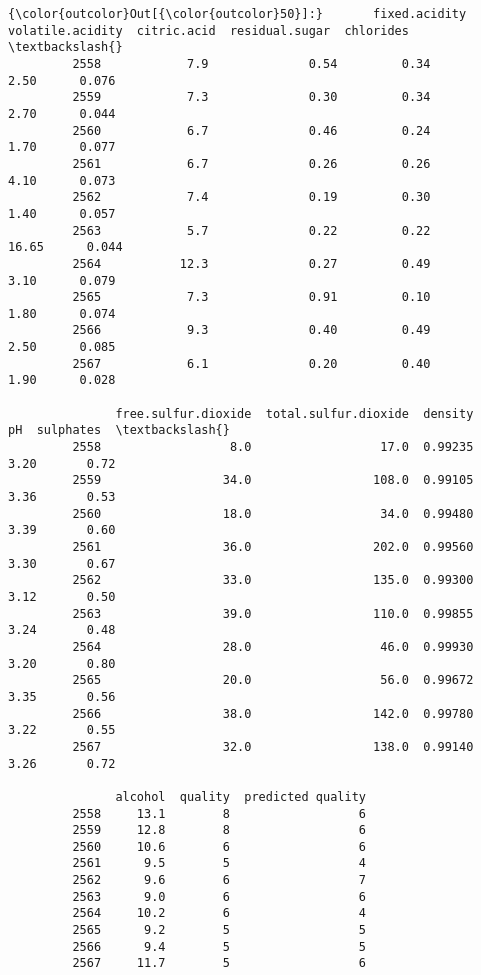 \documentclass[11pt]{article}
\begin{document}
\begin{Verbatim}[commandchars=\\\{\}]
{\color{outcolor}Out[{\color{outcolor}50}]:}       fixed.acidity  volatile.acidity  citric.acid  residual.sugar  chlorides  \textbackslash{}
         2558            7.9              0.54         0.34            2.50      0.076   
         2559            7.3              0.30         0.34            2.70      0.044   
         2560            6.7              0.46         0.24            1.70      0.077   
         2561            6.7              0.26         0.26            4.10      0.073   
         2562            7.4              0.19         0.30            1.40      0.057   
         2563            5.7              0.22         0.22           16.65      0.044   
         2564           12.3              0.27         0.49            3.10      0.079   
         2565            7.3              0.91         0.10            1.80      0.074   
         2566            9.3              0.40         0.49            2.50      0.085   
         2567            6.1              0.20         0.40            1.90      0.028   
         
               free.sulfur.dioxide  total.sulfur.dioxide  density    pH  sulphates  \textbackslash{}
         2558                  8.0                  17.0  0.99235  3.20       0.72   
         2559                 34.0                 108.0  0.99105  3.36       0.53   
         2560                 18.0                  34.0  0.99480  3.39       0.60   
         2561                 36.0                 202.0  0.99560  3.30       0.67   
         2562                 33.0                 135.0  0.99300  3.12       0.50   
         2563                 39.0                 110.0  0.99855  3.24       0.48   
         2564                 28.0                  46.0  0.99930  3.20       0.80   
         2565                 20.0                  56.0  0.99672  3.35       0.56   
         2566                 38.0                 142.0  0.99780  3.22       0.55   
         2567                 32.0                 138.0  0.99140  3.26       0.72   
         
               alcohol  quality  predicted quality  
         2558     13.1        8                  6  
         2559     12.8        8                  6  
         2560     10.6        6                  6  
         2561      9.5        5                  4  
         2562      9.6        6                  7  
         2563      9.0        6                  6  
         2564     10.2        6                  4  
         2565      9.2        5                  5  
         2566      9.4        5                  5  
         2567     11.7        5                  6  
\end{Verbatim}
            
\end{document}
